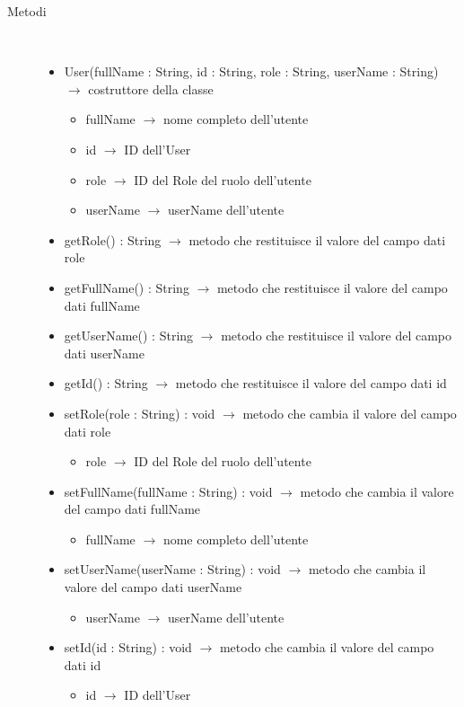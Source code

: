 \begin{description}
\item[Metodi] \hfill \\
\vspace{-7mm}
\begin{itemize}
	\item User(fullName : String, id : String, role : String, userName : String) $\rightarrow$ costruttore della classe\begin{itemize}
		\item fullName $\rightarrow$ nome completo dell'utente
		\item id $\rightarrow$ ID dell'User
		\item role $\rightarrow$ ID del Role del ruolo dell'utente
		\item userName $\rightarrow$ userName dell'utente
	\end{itemize}
	
	\item getRole() : String $\rightarrow$ metodo che restituisce il valore del campo dati role
	\item getFullName() : String $\rightarrow$ metodo che restituisce il valore del campo dati fullName
	\item getUserName() : String $\rightarrow$ metodo che restituisce il valore del campo dati userName
	\item getId() : String $\rightarrow$ metodo che restituisce il valore del campo dati id
	\item setRole(role : String) : void $\rightarrow$ metodo che cambia il valore del campo dati role\begin{itemize}
		\item role $\rightarrow$ ID del Role del ruolo dell'utente
	\end{itemize}
	
	\item setFullName(fullName : String) : void $\rightarrow$ metodo che cambia il valore del campo dati fullName\begin{itemize}
		\item fullName $\rightarrow$ nome completo dell'utente
	\end{itemize}
	
	\item setUserName(userName : String) : void $\rightarrow$ metodo che cambia il valore del campo dati userName\begin{itemize}
		\item userName $\rightarrow$ userName dell'utente
	\end{itemize}
	
	\item setId(id : String) : void $\rightarrow$ metodo che cambia il valore del campo dati id\begin{itemize}
		\item id $\rightarrow$ ID dell'User
	\end{itemize}
	
\end{itemize}

\end{description}

